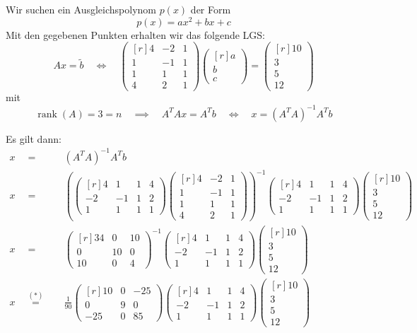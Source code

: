 \documentclass[answers]{exam}
\newcommand{\vektor}[1]{\begin{pmatrix*}[r] #1 \end{pmatrix*}}
\DeclareMathOperator{\rank}{rank}
\begin{document}
\begin{questions}
\begin{solution}
        Wir suchen ein Ausgleichspolynom $p(x)$ der Form
        $$
            p(x) = ax^2 + bx + c
        $$
        Mit den gegebenen Punkten erhalten wir das folgende LGS:
        $$
            Ax = \tilde{b} \quad \iff \quad \vektor{4 & -2 & 1 \\ 1 & -1 & 1 \\ 1 & 1 & 1 \\ 4 & 2 & 1} \vektor{a \\ b \\ c} = \vektor{10 \\ 3 \\ 5 \\ 12}
        $$
        mit
        $$
            \rank(A) = 3 = n \quad \implies \quad A^TAx = A^Tb \quad \iff \quad x = \left(A^T A\right)^{-1} A^T b
        $$

        Es gilt dann:
        $$
            \begin{aligned}
                x \quad = \quad                & \left(A^T A\right)^{-1} A^T b                  \\
                x \quad = \quad                & \left(\vektor{4               & 1   & 1   & 4  \\ -2 & -1 & 1 & 2 \\ 1 & 1 & 1 & 1} \vektor{4 & -2 & 1 \\ 1 & -1 & 1 \\ 1 & 1 & 1 \\ 4 & 2 & 1}\right)^{-1} \vektor{4                     & 1 & 1 & 4 \\ -2 & -1 & 1 & 2 \\ 1 & 1 & 1 & 1} \vektor{10 \\ 3 \\ 5 \\ 12}             \\
                x \quad = \quad                & \vektor{34                    & 0   & 10       \\ 0 & 10 & 0 \\ 10 & 0 & 4}^{-1} \vektor{4                     & 1 & 1 & 4 \\ -2 & -1 & 1 & 2 \\ 1 & 1 & 1 & 1} \vektor{10 \\ 3 \\ 5 \\ 12}             \\
                x \quad \overset{(*)}{=} \quad & \frac{1}{90}\vektor{10        & 0   & -25      \\ 0 & 9 & 0 \\ -25 & 0 & 85} \vektor{4                     & 1 & 1 & 4 \\ -2 & -1 & 1 & 2 \\ 1 & 1 & 1 & 1} \vektor{10 \\ 3 \\ 5 \\ 12}             \\

\end{aligned}$$
\end{solution}
\end{questions}
\end{document}
